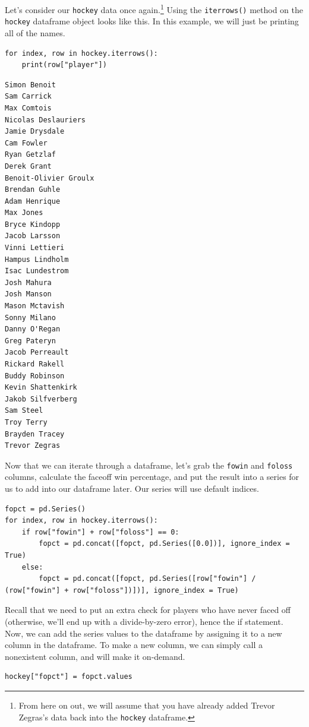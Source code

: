 Let's consider our \verb|hockey| data once again.\cprotect\footnote{From here on out, we will assume that you have already added Trevor Zegras's data back into the \verb|hockey| dataframe.} Using the \verb|iterrows()| method on the \verb|hockey| dataframe object looks like this. In this example, we will just be printing all of the names.\par
\begin{lstlisting}[style=pippython]
for index, row in hockey.iterrows():
	print(row["player"])
\end{lstlisting}
\begin{lstlisting}[style=none]
Simon Benoit
Sam Carrick
Max Comtois
Nicolas Deslauriers
Jamie Drysdale
Cam Fowler
Ryan Getzlaf
Derek Grant
Benoit-Olivier Groulx
Brendan Guhle
Adam Henrique
Max Jones
Bryce Kindopp
Jacob Larsson
Vinni Lettieri
Hampus Lindholm
Isac Lundestrom
Josh Mahura
Josh Manson
Mason Mctavish
Sonny Milano
Danny O'Regan
Greg Pateryn
Jacob Perreault
Rickard Rakell
Buddy Robinson
Kevin Shattenkirk
Jakob Silfverberg
Sam Steel
Troy Terry
Brayden Tracey
Trevor Zegras
\end{lstlisting}
Now that we can iterate through a dataframe, let's grab the \verb|fowin| and \verb|foloss| columns, calculate the faceoff win percentage, and put the result into a  series for us to add into our dataframe later. Our series will use default indices.\par
\begin{lstlisting}[style=pippython]
fopct = pd.Series()
for index, row in hockey.iterrows():
	if row["fowin"] + row["foloss"] == 0:
		fopct = pd.concat([fopct, pd.Series([0.0])], ignore_index = True)
	else:
		fopct = pd.concat([fopct, pd.Series([row["fowin"] / (row["fowin"] + row["foloss"])])], ignore_index = True)
\end{lstlisting}
Recall that we need to put an extra check for players who have never faced off (otherwise, we'll end up with a divide-by-zero error), hence the if statement. Now, we can add the series values to the dataframe by assigning it to a new column in the dataframe. To make a new column, we can simply call a nonexistent column, and  will make it on-demand.\par
\begin{lstlisting}[style=pippython]
hockey["fopct"] = fopct.values
\end{lstlisting}
